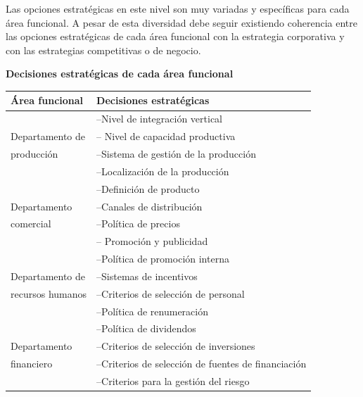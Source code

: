 \documentclass[10pt,a4paper,spanish]{report}
\begin{document}
                  Las opciones estratégicas en este nivel son muy variadas y específicas para cada área funcional. A pesar de esta diversidad debe seguir existiendo coherencia entre las opciones estratégicas de cada área funcional con la estrategia corporativa y con las estrategias competitivas o de negocio.

                  \begin{center}
                        \textbf{Decisiones estratégicas de cada área funcional}
                        \begin{tabular}{|p{5.7cm}|p{5.7cm}|}
                              \hline
                              \rowcolor[rgb]{0.4,0.9,0.6} \textbf{Área funcional} & \textbf{Decisiones estratégicas} \\
                              \hline
                              & --Nivel de integración vertical \\
                              Departamento de & -- Nivel de capacidad productiva \\
                              producción & --Sistema de gestión de la producción \\
                              & --Localización de la producción \\
                              \hline
                              & --Definición de producto \\
                              Departamento & --Canales de distribución \\
                              comercial & --Política de precios \\
                              & -- Promoción y publicidad \\
                              \hline
                              & --Política de promoción interna \\
                              Departamento de & --Sistemas de incentivos \\
                              recursos humanos & --Criterios de selección de personal \\
                              & --Política de renumeración \\
                              \hline
                              & --Política de dividendos \\
                              Departamento & --Criterios de selección de inversiones \\
                              financiero & --Criterios de selección de fuentes de financiación \\
                              & --Criterios para la gestión del riesgo \\
                              \hline
                        \end{tabular}
                  \end{center}
\end{document}
